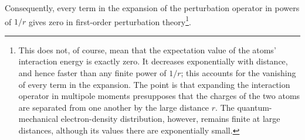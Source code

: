 Consequently, every term in the expansion of the perturbation operator in powers of $1/r$ gives zero in first-order perturbation theory\footnote{This does not, of course, mean that the expectation value of the atoms' interaction energy is exactly zero. It decreases exponentially with distance, and hence faster than any finite power of $1/r$; this accounts for the vanishing of every term in the expansion. The point is that expanding the interaction operator in multipole moments presupposes that the charges of the two atoms are separated from one another by the large distance $r$. The quantum-mechanical electron-density distribution, however, remains finite at large distances, although its values there are exponentially small.}.
